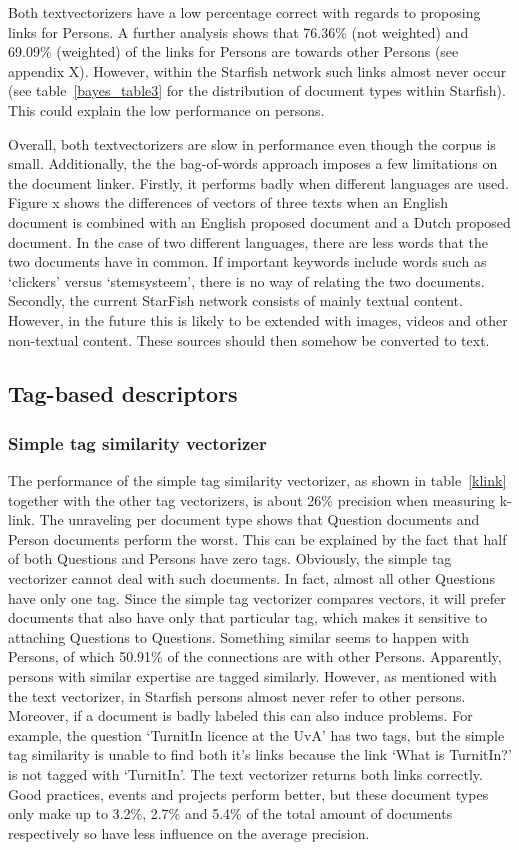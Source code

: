 Both textvectorizers have a low percentage correct with regards to proposing
links for Persons. A further analysis shows that 76.36\% (not weighted) and
69.09\% (weighted) of the links for Persons are towards other Persons (see
appendix X). However, within the Starfish network such links almost never occur
(see table~\ref{bayes_table3} for the distribution of document types within
Starfish). This could explain the low performance on persons. 

Overall, both textvectorizers are slow in performance even though the corpus is
small. Additionally, the the bag-of-words approach imposes a few limitations on
the document linker. Firstly, it performs badly when different languages are
used. Figure x shows the differences of vectors of three texts when an English
document is combined with an English proposed document and a Dutch proposed
document. In the case of two different languages, there are less words that the
two documents have in common. If important keywords include words such as
`clickers' versus `stemsysteem', there is no way of relating the two documents.
Secondly, the current StarFish network consists of mainly textual content.
However, in the future this is likely to be extended with images, videos and
other non-textual content. These sources should then somehow be converted to
text.

\subsection{Tag-based descriptors}

\subsubsection{Simple tag similarity vectorizer} 
The performance of the simple tag similarity vectorizer, as shown in
table~\ref{klink} together with the other tag vectorizers, is about 26\%
precision when measuring k-link. The unraveling per document type shows that
Question documents and Person documents perform the worst. This can be
explained by the fact that half of both Questions and Persons have zero tags.
Obviously, the simple tag vectorizer cannot deal with such documents. In fact,
almost all other Questions have only one tag. Since the simple tag vectorizer
compares vectors, it will prefer documents that also have only that particular
tag, which makes it sensitive to attaching Questions to Questions. Something
similar seems to happen with Persons, of which 50.91\% of the connections are
with other Persons.  Apparently, persons with similar expertise are tagged
similarly.  However, as mentioned with the text vectorizer, in Starfish persons
almost never refer to other persons.
Moreover, if a document is badly labeled
this can also induce problems. For example, the question `TurnitIn licence at the 
UvA' has two tags, but the simple tag similarity is unable to find both it's links because 
the link `What is TurnitIn?' is not tagged with `TurnitIn'. The text vectorizer returns both
links correctly. Good practices, events and projects perform better, 
but these document types only make up to 3.2\%, 2.7\% and 5.4\% of the
total amount of documents respectively so have less influence on the average
precision.

